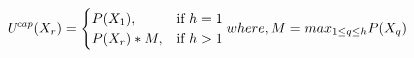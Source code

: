 %
\begin{equation}\label{equation:cap}
\text{\emph{U\textsuperscript{cap}}}(X_r) =\begin{cases}
				P(X_1), & \text{if $ h = 1$}\\
				P(X_r)*M, & \text{if $ h > 1$}
             
\end{cases}
where, M=max_{1\leq q\leq h}P(X_q)
\end{equation}
%